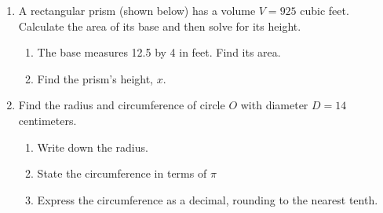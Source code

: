 \documentclass[12pt, twoside]{article}
\begin{document}
\begin{enumerate}
\newpage
\item A rectangular prism (shown below) has a volume $V=925$ cubic feet. Calculate the area of its base and then solve for its height.
\begin{multicols}{2}
\begin{enumerate}
  \item The base measures 12.5 by 4 in feet. Find its area.
  \item Find the prism's height, $x$. \vspace{2cm}
\end{enumerate}
  \begin{flushright}
  \end{flushright}
\end{multicols}

\newpage
\item Find the radius and circumference of circle $O$ with diameter $D=14$ centimeters.
  \begin{multicols}{2}
  \raggedcolumns
  \begin{enumerate}
    \item Write down the radius. \vspace{1.2cm}
    \item State the circumference in terms of $\pi$ \vspace{1cm}
    \item Express the circumference as a decimal, rounding to the nearest tenth.
  \end{enumerate}
  \columnbreak
  \end{multicols}

\end{enumerate}
\end{document}
